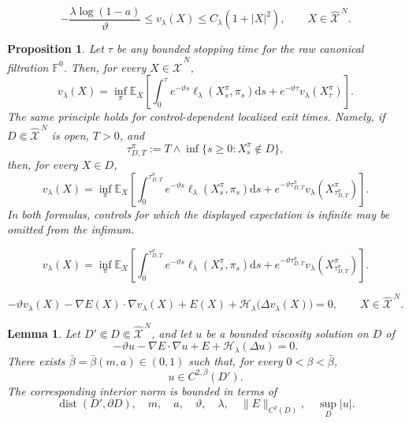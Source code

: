 \documentclass[10pt,a4paper]{amsart}
\newtheorem{proposition}{Proposition}
\newtheorem{lemma}{Lemma}
\def\E{\mathbb{E}}
\def\Xc{{\mathcal X}}
\newcommand{\dd}{\mathrm{d}}
\def\hX{\widehat{\Xc}^{\,N}}
\begin{document}
\begin{equation}
 -\frac{\lambda\log(1-a)}{\vartheta}
 \le v_\lambda(X)\le C_\lambda(1+|X|^2),
 \qquad X\in\hX.
\end{equation}

\begin{proposition}\label{prop:DPP}
Let $\tau$ be any bounded stopping time for the raw canonical filtration $\mathbb F^0$.  Then, for
every $X\in\hX$,
\begin{equation}\label{eq:DPP-HJB-detailed}
 v_\lambda(X)=\inf_\pi\E_X\left[
 \int_0^\tau e^{-\vartheta s}\ell_\lambda(X_s^\pi,\pi_s)\dd s
 +e^{-\vartheta\tau}v_\lambda(X_\tau^\pi)\right].
\end{equation}
The same principle holds for control-dependent localized exit times.  Namely, if
$D\Subset\hX$ is open, $T>0$, and
\begin{equation}\label{eq:localized-stopping-time-DPP}
 \tau_{D,T}^\pi
 :=T\wedge\inf\{s\ge0:X_s^\pi\notin D\},
\end{equation}
then, for every $X\in D$,
\begin{equation}\label{eq:DPP-stopping-control}
 v_\lambda(X)=\inf_\pi\E_X\left[
 \int_0^{\tau_{D,T}^\pi}e^{-\vartheta s}
 \ell_\lambda(X_s^\pi,\pi_s)\dd s
 +e^{-\vartheta\tau_{D,T}^\pi}
 v_\lambda(X_{\tau_{D,T}^\pi}^\pi)\right].
\end{equation}
In both formulas, controls for which the displayed expectation is infinite may be omitted from the
infimum.
\end{proposition}

\begin{equation}
 v_\lambda(X)=\inf_\pi\E_X\left[
 \int_0^{\tau_{D,T}^\pi}e^{-\vartheta s}
 \ell_\lambda(X_s^\pi,\pi_s)\dd s
 +e^{-\vartheta\tau_{D,T}^\pi}
 v_\lambda(X_{\tau_{D,T}^\pi}^\pi)\right].
\end{equation}

\begin{equation}\label{eq:exploratory-HJB}
 -\vartheta v_\lambda(X)
 -\nabla E(X)\cdot\nabla v_\lambda(X)
 +E(X)
 +\mathscr H_\lambda\bigl(\Delta v_\lambda(X)\bigr)=0,
 \qquad X\in\hX.
\end{equation}

\begin{lemma}\label{lem:HJB-interior-regularity}
Let $D'\Subset D\Subset\hX$, and let $u$ be a bounded viscosity solution on $D$ of
\[
 -\vartheta u-\nabla E\cdot\nabla u+E+\mathscr H_\lambda(\Delta u)=0.
\]
There exists
$\bar\beta=\bar\beta(m,a)\in(0,1)$ such that, for every
$0<\beta<\bar\beta$,
\[
 u\in C^{2,\beta}(D').
\]
The corresponding interior norm is bounded in terms of
\[
 \operatorname{dist}(D',\partial D),\quad m,\quad a,\quad
 \vartheta,\quad\lambda,\quad
 \|E\|_{C^2(D)},\quad\sup_D|u|.
\]
\end{lemma}
\end{document}
